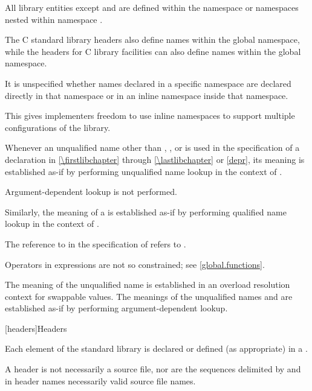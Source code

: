 \pnum
All library entities except
and
are defined within the namespace
or namespaces nested within namespace
.
\begin{footnote}
The C standard library headers also define
names within the global namespace, while the \Cpp{} headers for C library
facilities can also define names within the global namespace.
\end{footnote}
It is unspecified whether names declared in a specific namespace are declared
directly in that namespace or in an inline namespace inside that
namespace.
\begin{footnote}
This gives implementers freedom to use inline namespaces to
support multiple configurations of the library.
\end{footnote}

\pnum
Whenever an unqualified name other than
, , or 
is used in the specification of a declaration 
in \ref{\firstlibchapter} through \ref{\lastlibchapter} or \ref{depr},
its meaning is established
as-if by performing unqualified name lookup
in the context of .
\begin{note}
Argument-dependent lookup is not performed.
\end{note}
Similarly, the meaning of a  is established
as-if by performing qualified name lookup
in the context of .
\begin{example}
The reference to  in the specification of  refers to .
\end{example}
\begin{note}
Operators in expressions are not so constrained;
see \ref{global.functions}.
\end{note}
The meaning of the unqualified name  is established
in an overload resolution context
for swappable values.
The meanings of the unqualified names
 and  are established
as-if by performing argument-dependent lookup.


[headers]{Headers}

\pnum
Each element of the \Cpp{} standard library is declared or defined (as appropriate) in a
.
\begin{footnote}
A header is not necessarily a source file, nor are the
sequences delimited by \tcode{<} and \tcode{>} in header names necessarily valid source
file names.
\end{footnote}


